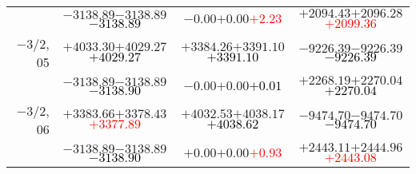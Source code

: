 \documentclass[compress]{beamer}
\begin{document}
\begin{frame}
{\begin{tabular}{r | c | c | c}
           & $-3138.89$\hspace{0.1 cm}$-3138.89$\hspace{0.1 cm}\textcolor{black}{$-3138.89$} & $-0.00$\hspace{0.1 cm}$+0.00$\hspace{0.1 cm}\textcolor{red}{$+2.23$} & $+2094.43$\hspace{0.1 cm}$+2096.28$\hspace{0.1 cm}\textcolor{red}{$+2099.36$} \\
$-$3/2, 05 & $+4033.30$\hspace{0.1 cm}$+4029.27$\hspace{0.1 cm}\textcolor{black}{$+4029.27$} & $+3384.26$\hspace{0.1 cm}$+3391.10$\hspace{0.1 cm}\textcolor{black}{$+3391.10$} & $-9226.39$\hspace{0.1 cm}$-9226.39$\hspace{0.1 cm}\textcolor{black}{$-9226.39$} \\
           & $-3138.89$\hspace{0.1 cm}$-3138.89$\hspace{0.1 cm}\textcolor{black}{$-3138.90$} & $-0.00$\hspace{0.1 cm}$+0.00$\hspace{0.1 cm}\textcolor{black}{$+0.01$} & $+2268.19$\hspace{0.1 cm}$+2270.04$\hspace{0.1 cm}\textcolor{black}{$+2270.04$} \\
$-$3/2, 06 & $+3383.66$\hspace{0.1 cm}$+3378.43$\hspace{0.1 cm}\textcolor{red}{$+3377.89$} & $+4032.53$\hspace{0.1 cm}$+4038.17$\hspace{0.1 cm}\textcolor{black}{$+4038.62$} & $-9474.70$\hspace{0.1 cm}$-9474.70$\hspace{0.1 cm}\textcolor{black}{$-9474.70$} \\
           & $-3138.89$\hspace{0.1 cm}$-3138.89$\hspace{0.1 cm}\textcolor{black}{$-3138.90$} & $+0.00$\hspace{0.1 cm}$+0.00$\hspace{0.1 cm}\textcolor{red}{$+0.93$} & $+2443.11$\hspace{0.1 cm}$+2444.96$\hspace{0.1 cm}\textcolor{red}{$+2443.08$} \\
\end{tabular}}
\end{frame}
\end{document}
